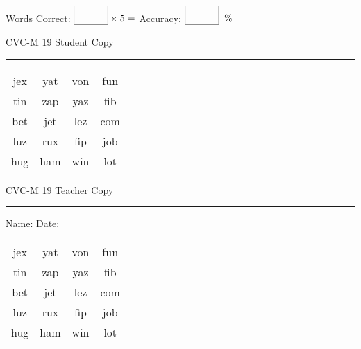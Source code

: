 \documentclass{memoir}
\begin{document}
\small

Words Correct: $\fbox{\phantom{\huge 100}} \times 5 = $ Accuracy: $\fbox{\phantom{\huge 100}}\;\; \%$ 

\vfill

\newpage


\footnotesize \noindent
CVC-M 19 \hfill Student Copy
\smallskip
\hrule

\Large

\setlength{\tabcolsep}{14pt}
\def\arraystretch{2}

{\selectfont


\begin{vplace}[0.5]
\begin{center}
\begin{tabular}{cccc}
jex & yat & von & fun \\
tin & zap & yaz & fib \\
bet & jet & lez & com \\
luz & rux & fip & job \\
hug & ham & win & lot \\
\end{tabular}
\end{center}
\end{vplace}

}

\newpage

\footnotesize \noindent
CVC-M 19 \hfill Teacher Copy
\smallskip
\hrule

\small

\vfill

\noindent
Name: \underline{\hspace{1.75in}} \hfill Date: \underline{\hspace{1in}}

\Large

{\selectfont


\begin{vplace}[0.5]
\begin{center}
\begin{tabular}{cccc}
jex & yat & von & fun \\
tin & zap & yaz & fib \\
bet & jet & lez & com \\
luz & rux & fip & job \\
hug & ham & win & lot \\
\end{tabular}
\end{center}
\end{vplace}



}
\end{document}
